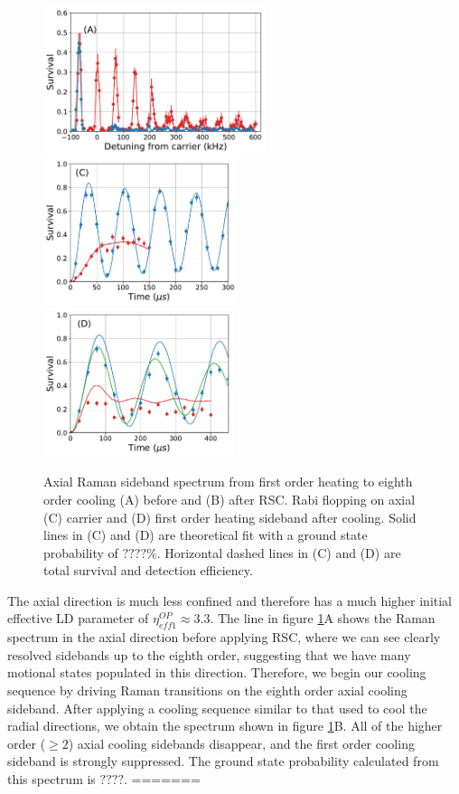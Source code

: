 \documentclass[aps,prl,twocolumn,groupedaddress]{revtex4-1}
\begin{document}
\begin{figure}
  \includegraphics[height=4.3cm]{imgs/spectrum_a1.pdf}
  \includegraphics[height=4.3cm]{imgs/rabi_flop_a1_0.pdf}
  \includegraphics[height=4.3cm]{imgs/rabi_flop_a1_p1.pdf}
  \caption{Axial Raman sideband spectrum from first order heating to eighth order cooling
    (A) before and (B) after RSC.
    Rabi flopping on axial (C) carrier and (D) first order heating sideband
    after cooling.
    Solid lines in (C) and (D) are theoretical fit with a ground state probability of $????\%$.
    Horizontal dashed lines in (C) and (D) are total survival and detection efficiency.
    \label{f-axial}}
\end{figure}

The axial direction is much less confined and therefore has a much higher initial effective
LD parameter of $\eta^{OP}_{eff1}\approx3.3$.
The line in figure \ref{f-axial}A shows the Raman spectrum in the axial direction
before applying RSC, where we can see clearly resolved sidebands
up to the eighth order, suggesting that we have many motional states populated in this direction.
Therefore, we begin our cooling sequence by driving Raman transitions on the eighth order axial
cooling sideband. After applying a cooling sequence similar to that used to cool
the radial directions, we obtain the spectrum shown in figure \ref{f-axial}B.
All of the higher order ($\geqslant2$) axial cooling sidebands disappear, and the first order
cooling sideband is strongly suppressed.
The ground state probability calculated from this spectrum is $????$.
=======
\end{document}
